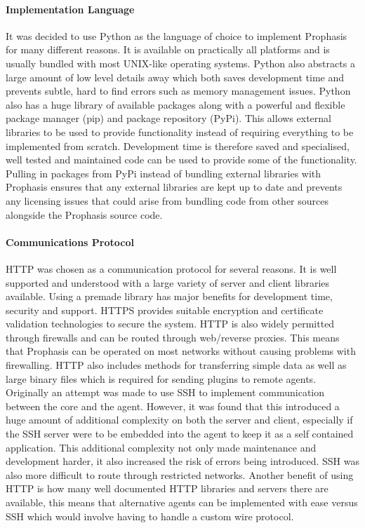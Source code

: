 \documentclass[bsc,deptreport,twoside,parskip,singlespacing,notimes]{infthesis}
\begin{document}
\paragraph*{Implementation Language}
	It was decided to use Python as the language of choice to implement Prophasis
	for many different reasons. It is available on practically all
	platforms and is usually bundled with most UNIX-like operating systems.  Python
	also abstracts a large amount of low level details away which both saves
	development time and prevents subtle, hard to find errors such as memory
	management issues.  Python also has a huge library of available packages along
	with a powerful and flexible package manager (pip) and package repository
	(PyPi).  This allows external libraries to be used to provide functionality
	instead of requiring everything to be implemented from scratch.  Development time
	is therefore saved and specialised, well tested and maintained code
	can be used to provide some of the functionality.  Pulling in packages from
	PyPi instead of bundling external libraries with Prophasis ensures that any
	external libraries are kept up to date and prevents any licensing issues that
	could arise from bundling code from other sources alongside the Prophasis
	source code.

\paragraph*{Communications Protocol}
	HTTP was chosen as a communication protocol for several reasons.  It is well
	supported and understood with a large variety of server and client libraries
	available.  Using a premade library has major benefits for development time,
	security and support. HTTPS provides suitable encryption and certificate
	validation technologies to secure the system. HTTP is also widely permitted
	through firewalls and can be routed through web/reverse proxies.  This means
	that Prophasis can be operated on most networks without causing problems with
	firewalling.  HTTP also includes methods for transferring simple data as well
	as large binary files which is required for sending plugins to remote agents.
	Originally an attempt was made to use SSH to implement communication between
	the core and the agent.  However, it was found that this introduced a huge
	amount of additional complexity on both the server and client, especially if
	the SSH server were to be embedded into the agent to keep it as a self
	contained application.  This additional complexity not only made maintenance
	and development harder, it also increased the risk of errors being introduced.
	SSH was also more difficult to route through restricted networks.  Another
	benefit of using HTTP is how many well documented HTTP libraries and servers
	there are available, this means that alternative agents can be implemented with
	ease versus SSH which would involve having to handle a custom wire protocol.
\end{document}

